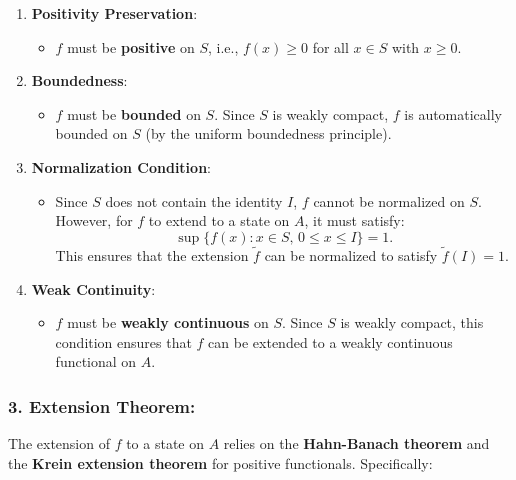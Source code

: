 \documentclass{article}
\begin{document}
\begin{enumerate}
\item \textbf{Positivity Preservation}: 

\begin{itemize}
\item $f $ must be \textbf{positive} on $S $, i.e., $f(x) \geq 0 $ for all $%
x \in S $ with $x \geq 0 $. 
\end{itemize}

\item \textbf{Boundedness}: 

\begin{itemize}
\item $f $ must be \textbf{bounded} on $S $. Since $S $ is weakly compact, $%
f $ is automatically bounded on $S $ (by the uniform boundedness principle). 
\end{itemize}

\item \textbf{Normalization Condition}: 

\begin{itemize}
\item Since $S $ does not contain the identity $I $, $f $ cannot be
normalized on $S $. However, for $f $ to extend to a state on $A $, it must
satisfy:  
\begin{equation*}
\sup \{ f(x) : x \in S, \, 0 \leq x \leq I \} = 1.  
\end{equation*}
This ensures that the extension $\tilde{f} $ can be normalized to satisfy $%
\tilde{f}(I) = 1 $. 
\end{itemize}

\item \textbf{Weak Continuity}: 

\begin{itemize}
\item $f $ must be \textbf{weakly continuous} on $S $. Since $S $ is weakly
compact, this condition ensures that $f $ can be extended to a weakly
continuous functional on $A $. 
\end{itemize}
\end{enumerate}

\subsubsection*{3. \textbf{Extension Theorem}:}

The extension of $f $ to a state on $A $ relies on the \textbf{Hahn-Banach
theorem} and the \textbf{Krein extension theorem} for positive functionals.
Specifically:
\end{document}
